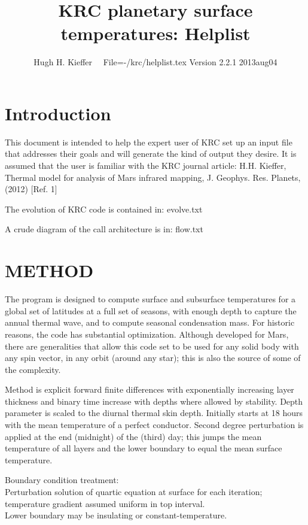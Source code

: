 \documentclass[draft]{article}  %
\title{KRC planetary surface temperatures: Helplist}
\author{Hugh H. Kieffer  \ \ File=-/krc/helplist.tex Version 2.2.1 2013aug04}
\newcommand{\qi}{\\ \hspace*{2.em}}      %
\begin{document}
\maketitle

\tableofcontents


\section{Introduction} %

This document is intended to help the expert user of KRC set up an input file
that addresses their goals and will generate the kind of output they desire. It
is assumed that the user is familiar with the KRC journal article: H.H. Kieffer,
Thermal model for analysis of Mars infrared mapping, J. Geophys. Res. Planets,
(2012) [Ref. 1]

The evolution of KRC code is contained in:  evolve.txt 

A crude diagram of the call architecture is in:  flow.txt 

\section{METHOD}

The program is designed to compute surface and subsurface temperatures for a
global set of latitudes at a full set of seasons, with enough depth to capture
the annual thermal wave, and to compute seasonal condensation mass. For historic
reasons, the code has substantial optimization. Although developed for Mars,
there are generalities that allow this code set to be used for any solid body
with any spin vector, in any orbit (around any star); this is also the source of
some of the complexity.
 
Method is explicit forward finite differences with exponentially increasing
layer thickness and binary time increase with depths where allowed by stability.
Depth parameter is scaled to the diurnal thermal skin depth.  Initially starts
at 18 hours with the mean temperature of a perfect conductor.  Second degree
perturbation is applied at the end (midnight) of the (third) day; this jumps the
mean temperature of all layers and the lower boundary to equal the mean surface
temperature.

Boundary condition treatment:
\qi  Perturbation solution of quartic equation at surface for each iteration;
    temperature gradient assumed uniform in top interval.
\qi  Lower boundary may be insulating or constant-temperature.
\end{document}
